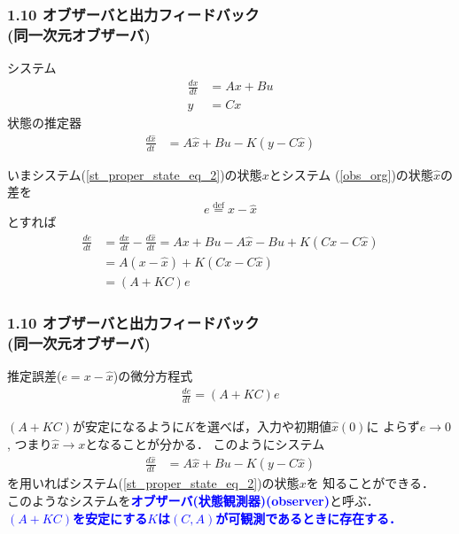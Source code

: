 \documentclass[10pt]{beamer}
\begin{document}
\begin{frame}[t]
\frametitle{1.10 オブザーバと出力フィードバック \\
(同一次元オブザーバ)}
システム
\begin{align}
 \frac{dx}{dt} &= A x + B u  \\
 y             &= C x 
\end{align}
状態の推定器
\begin{align}
 \frac{d \hat{x}}{dt} &= A \hat{x} + B u - K (y - C \hat{x})
 \tag{1.204} 
\end{align}
\addtocounter{equation}{4}
いまシステム(\ref{st_proper_state_eq_2})の状態$x$とシステム
(\ref{obs_org})の状態$\hat{x} $の差を
\begin{equation}
 e \stackrel{\text{def}}{=} x - \hat{x}
\end{equation}
とすれば
\begin{align}
\frac{de}{dt} &= \frac{dx}{dt} - \frac{d \hat{x}}{dt} 
  = A x + B u - A \hat{x} - B u + K ( C x - C \hat{x}) \nonumber \\
 &= A (x - \hat{x}) + K ( C x - C \hat{x}) \nonumber \\
 &= (A + KC) e
\end{align}
\end{frame}


\begin{frame}[t]
\frametitle{1.10 オブザーバと出力フィードバック \\
(同一次元オブザーバ)}

推定誤差($e = x - \hat{x}$)の微分方程式
\begin{align}
\frac{de}{dt} = (A + KC) e \tag{1.206}
\end{align}



$(A+KC)$が安定になるように$K$を選べば，入力や初期値$\hat{x}(0)$に
よらず$e \rightarrow 0$, つまり$\hat{x} \rightarrow x$となることが分かる．
このようにシステム
\begin{align}
 \frac{d \hat{x}}{dt} &= A \hat{x} + B u - K (y - C \hat{x})
 \tag{1.204} 
\end{align}
を用いればシステム(\ref{st_proper_state_eq_2})の状態$x$を
知ることができる．\\
このようなシステムを\textcolor{blue}{\bf オブザーバ(状態観測器)(observer)}と呼ぶ．\\
\textcolor{blue}{\bf $(A + KC)$を安定にする$K$は$(C, A)$が可観測であるときに存在する．}
\end{frame}
\end{document}
